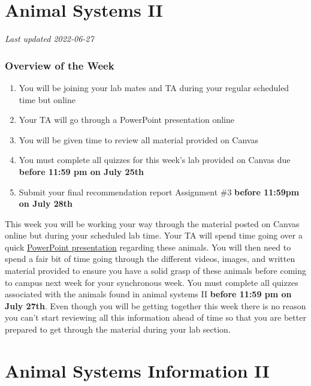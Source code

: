 \documentclass[
]{book}
\providecommand{\tightlist}{%
  \setlength{\itemsep}{0pt}\setlength{\parskip}{0pt}}
\begin{document}
\hypertarget{animal-systems-ii}{%
\chapter*{Animal Systems II}\label{animal-systems-ii}}

\emph{Last updated 2022-06-27}

\hypertarget{overview-of-the-week-2}{%
\subsection*{Overview of the Week}\label{overview-of-the-week-2}}

\begin{enumerate}
\def\labelenumi{\arabic{enumi}.}
\tightlist
\item
  You will be joining your lab mates and TA during your regular scheduled time but online
\item
  Your TA will go through a PowerPoint presentation online
\item
  You will be given time to review all material provided on Canvas
\item
  You must complete all quizzes for this week's lab provided on Canvas due \textbf{before 11:59 pm on July 25th}
\item
  Submit your final recommendation report Assignment \#3 \textbf{before 11:59pm on July 28th}
\end{enumerate}

This week you will be working your way through the material posted on Canvas online but during your scheduled lab time. Your TA will spend time going over a quick \href{files/Animal_Systems_Presentation_II.pptx}{PowerPoint presentation} regarding these animals. You will then need to spend a fair bit of time going through the different videos, images, and written material provided to ensure you have a solid grasp of these animals before coming to campus next week for your synchronous week. You must complete all quizzes associated with the animals found in animal systems II \textbf{before 11:59 pm on July 27th}. Even though you will be getting together this week there is no reason you can't start reviewing all this information ahead of time so that you are better prepared to get through the material during your lab section.

\hypertarget{animal-systems-information-ii}{%
\chapter*{Animal Systems Information II}\label{animal-systems-information-ii}}
\end{document}
